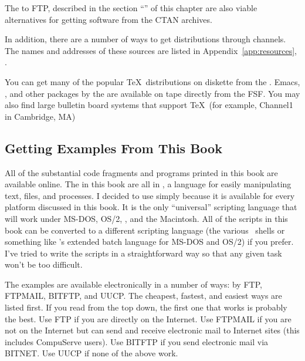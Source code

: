 The  to FTP,
described in the section ``'' of this chapter are
also viable alternatives for getting software from the CTAN archives.

In addition, there are a number of ways to get distributions through
 channels.  The names and
addresses of these sources are listed in Appendix~\ref{app:resources},
\textit{}.

\vfill\eject
You can get many of the popular \TeX\ distributions on diskette from the
.  Emacs, , and other packages by the
 are available on tape directly from the FSF.  You may also find large
bulletin board systems that support \TeX\ (for example, Channel1 in Cambridge,
MA)

\subsection{Getting Examples From This Book}
\label{sec:gettingexamples}

All of the substantial code fragments and programs printed in this book are
available online.  The  in this book are
all in , a language
for easily manipulating text, files, and processes. 
I decided to use  simply because it
is available for every platform
discussed in this book.  It is the only ``universal'' scripting language that
will work under MS-DOS, OS/2, \Unix, and the Macintosh.  All of the scripts in
this book can be converted to a different scripting language (the various
\Unix\ shells or something like 's extended batch language for MS-DOS and
OS/2) if you prefer.  I've tried to write the  scripts in a
straightforward way so that any given task won't be too difficult.

The examples are available electronically in a number of ways: by FTP,
FTPMAIL, BITFTP, and UUCP. The cheapest, fastest, and easiest ways are listed
first. If you read from the top down, the first one that works is probably the
best. Use FTP if you are directly on the Internet. Use FTPMAIL if you are not
on the Internet but can send and receive electronic mail to Internet sites
(this includes CompuServe users). Use BITFTP if you send electronic mail via
BITNET. Use UUCP if none of the above work.

